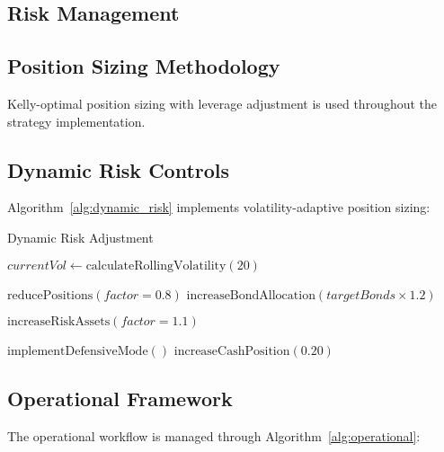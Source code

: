 \documentclass[11pt]{IEEEtran}
\begin{document}
\begin{multicols}{2}
\section{Risk Management}

\subsection{Position Sizing Methodology}

Kelly-optimal position sizing with leverage adjustment is used throughout the strategy implementation.

\end{multicols}

\subsection{Dynamic Risk Controls}

Algorithm~\ref{alg:dynamic_risk} implements volatility-adaptive position sizing:

\begin{algorithm}
\caption{Dynamic Risk Adjustment}
\label{alg:dynamic_risk}
\begin{algorithmic}[1]
    \State $currentVol \gets \text{calculateRollingVolatility}(20)$
    
        \State $\text{reducePositions}(factor=0.8)$ 
        \State $\text{increaseBondAllocation}(targetBonds \times 1.2)$
    \EndIf
    
        \State $\text{increaseRiskAssets}(factor=1.1)$ 
    \EndIf
    
        \State $\text{implementDefensiveMode}()$ 
        \State $\text{increaseCashPosition}(0.20)$
    \EndIf
\EndFunction
\end{algorithmic}
\end{algorithm}

\subsection{Operational Framework}

The operational workflow is managed through Algorithm~\ref{alg:operational}:
\end{document}
